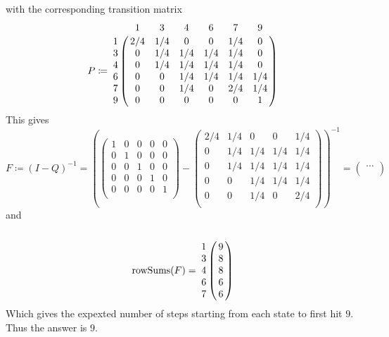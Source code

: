 \documentclass{article}
\DeclareMathOperator\rowSums{rowSums}
\begin{document}
\begin{center}
\end{center}
with the corresponding transition matrix
\begin{equation}
	P \coloneqq \bordermatrix{~ & 1 & 3 & 4 & 6 & 7 & 9 \cr
		1 & 2/4 & 1/4 & 0 & 0 & 1/4 & 0 \cr
		3 & 0 & 1/4 & 1/4 & 1/4 & 1/4 & 0 \cr
		4 & 0 & 1/4 & 1/4 & 1/4 & 1/4 & 0 \cr
		6 & 0 & 0 & 1/4 & 1/4 & 1/4 & 1/4 \cr
		7 & 0 & 0 & 1/4 & 0 & 2/4 & 1/4 \cr
		9 & 0 & 0 & 0 & 0 & 0 & 1 \cr
		}
\end{equation}
This gives
$$ F \coloneqq (I - Q)^{-1} = \left(\begin{pmatrix}
		1 & 0 & 0 & 0 & 0 \\
		0 & 1 & 0 & 0 & 0 \\
		0 & 0 & 1 & 0 & 0 \\
		0 & 0 & 0 & 1 & 0 \\
		0 & 0 & 0 & 0 & 1 \\
\end{pmatrix} - \begin{pmatrix}
		2/4 & 1/4 & 0 & 0 & 1/4 \\
		0 & 1/4 & 1/4 & 1/4 & 1/4 \\
		0 & 1/4 & 1/4 & 1/4 & 1/4 \\
		0 & 0 & 1/4 & 1/4 & 1/4 \\
		0 & 0 & 1/4 & 0 & 2/4 \\
\end{pmatrix}\right)^{-1}
	= \begin{pmatrix}
		\cdots \\
	\end{pmatrix}
	$$
and
$$ \rowSums(F) = \bordermatrix{
	~ & ~ \cr
	1 & 9 \cr
	3 & 8 \cr
	4 & 8 \cr
	6 & 6 \cr
	7 & 6 \cr
	}
	$$
Which gives the expexted number of steps starting from each state
to first hit $9$.
Thus the answer is $9$.
\end{document}
